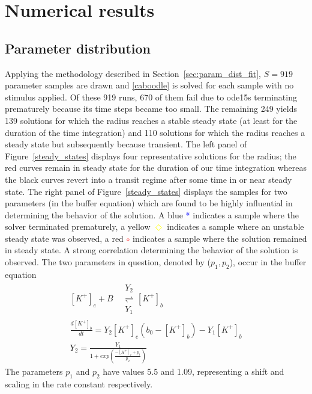 \section{Numerical results}
\label{sec:results}

\subsection{Parameter distribution}
\label{sec:param_sampling}

Applying the methodology described in Section~\ref{sec:param_dist_fit}, $S=919$ parameter samples are drawn and \eqref{caboodle} is solved for each sample with no stimulus applied. Of these 919 runs, 670 of them fail due to ode15s terminating prematurely because its time steps became too small. The remaining 249 yields 139 solutions for which the radius reaches a stable steady state (at least for the duration of the time integration) and 110 solutions for which the radius reaches a steady state but subsequently because transient. The left panel of Figure~\ref{steady_states} displays four representative solutions for the radius; the red curves remain in steady state for the duration of our time integration whereas the black curves revert into a transit regime after some time in or near steady state. The right panel of Figure~\ref{steady_states} displays the samples for two parameters (in the buffer equation) which are found to be highly influential in determining the behavior of the solution. A blue \textcolor{blue}{*} indicates a sample where the solver terminated prematurely, a yellow \textcolor{yellow}{$\Diamond$} indicates a sample where an unstable steady state was observed, a red \textcolor{red}{$\circ$} indicates a sample where the solution remained in steady state. A strong correlation determining the behavior of the solution is observed. The two parameters in question, denoted by ($p_1,p_2$), occur in the buffer equation
\begin{eqnarray}\label{eqn:buff}
[K^+]_e+B \quad\begin{array}{c}
Y_2 \\ 
 \rightleftharpoons \\
Y_1
\end{array} 
[K^+]_b \nonumber \\
\frac{d[K^+]_b}{dt}=Y_2[K^+]_e(b_0-[K^+]_b)-Y_1[K^+]_b \nonumber \\
Y_2=\frac{Y_1}{1+exp(\frac{-[K^+]_e+p_1}{p_2})}
\end{eqnarray}
The parameters $p_1$ and $p_2$ have values 5.5 and 1.09, representing a shift and scaling in the rate constant respectively. 
